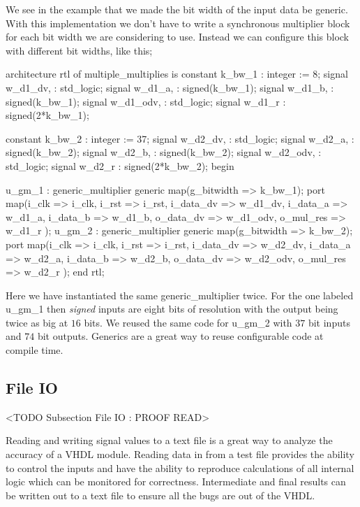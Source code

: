 We see in the example that we made the bit width of the input data be generic. With this implementation we don't have to write a synchronous multiplier block for each bit width we are considering to use. Instead we can configure this block with different bit widths, like this;

\begin{VHDLlisting}[tabsize=8]
architecture rtl of multiple_multiplies is
	constant k_bw_1    : integer := 8;
	signal w_d1_dv,    : std_logic;
	signal w_d1_a,     : signed(k_bw_1);
	signal w_d1_b,     : signed(k_bw_1);
	signal w_d1_odv,   : std_logic;
	signal w_d1_r      : signed(2*k_bw_1);

	constant k_bw_2    : integer := 37;
	signal w_d2_dv,    : std_logic;
	signal w_d2_a,     : signed(k_bw_2);
	signal w_d2_b,     : signed(k_bw_2);
	signal w_d2_odv,   : std_logic;
	signal w_d2_r      : signed(2*k_bw_2);
begin

u_gm_1 : generic_multiplier
generic map(g_bitwidth => k_bw_1);
port map(i_clk      => i_clk,
		 i_rst      => i_rst,
		 i_data_dv  => w_d1_dv,
		 i_data_a   => w_d1_a,
		 i_data_b   => w_d1_b,
		 o_data_dv  => w_d1_odv,
		 o_mul_res  => w_d1_r
);
u_gm_2 : generic_multiplier
generic map(g_bitwidth => k_bw_2);
port map(i_clk      => i_clk,
		 i_rst      => i_rst,
		 i_data_dv  => w_d2_dv,
		 i_data_a   => w_d2_a,
		 i_data_b   => w_d2_b,
		 o_data_dv  => w_d2_odv,
		 o_mul_res  => w_d2_r
);
end rtl;
\end{VHDLlisting}

Here we have instantiated the same generic\_multiplier twice. For the one labeled u\_gm\_1 then \emph{signed} inputs are eight bits of resolution with the output being twice as big at $16$ bits. We reused the same code for u\_gm\_2 with $37$ bit inputs and $74$ bit outputs. Generics are a great way to reuse configurable code at compile time.
	
\subsection{File IO}
	<TODO Subsection File IO : PROOF READ>

Reading and writing signal values to a text file is a great way to analyze the accuracy of a \ac{VHDL} module. Reading data in from a test file provides the ability to control the inputs and have the ability to reproduce calculations of all internal logic which can be monitored for correctness. Intermediate and final results can be written out to a text file to ensure all the bugs are out of the \ac{VHDL}. 

